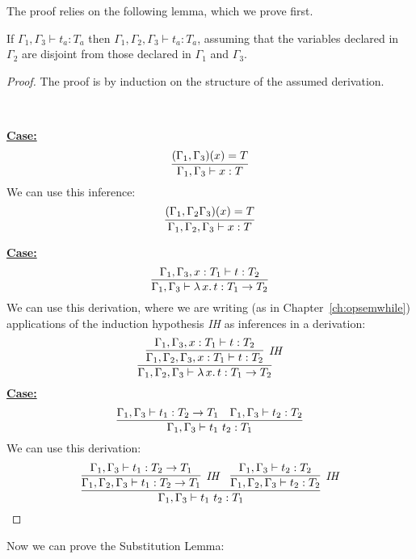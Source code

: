\documentclass{article}
\begin{document}
The proof relies on the
following lemma, which we prove first.

\begin{lemma}[Weakening]
\label{lem:stlcweak}
If $\Gamma_1, \Gamma_3 \vdash t_a : T_a$ then $\Gamma_1, \Gamma_2,
\Gamma_3 \vdash t_a : T_a$, assuming that the variables declared in
$\Gamma_2$ are disjoint from those declared in $\Gamma_1$ and
$\Gamma_3$.
\end{lemma}

\begin{proof}
The proof is by induction on the structure of the assumed derivation.

\ 

\noindent\underline{\textbf{Case:}}
\[
\infer{\Gamma_1,\Gamma_3\vdash x : T}{(\Gamma_1,\Gamma_3)(x) = T} 
\]
\noindent We can use this inference:
\[
\infer{\Gamma_1,\Gamma_2,\Gamma_3\vdash x : T}{(\Gamma_1,\Gamma_2\Gamma_3)(x) = T} 
\]

\noindent\underline{\textbf{Case:}}
\[
\infer{\Gamma_1,\Gamma_3\vdash \lambda\,x.\,t : T_1 \to T_2}
      {\Gamma_1,\Gamma_3,x:T_1\vdash t:T_2}
\]
\noindent We can use this derivation, where we are writing (as in Chapter~\ref{ch:opsemwhile})
applications of the induction hypothesis \textit{IH} as inferences in a derivation:
\[
\infer{\Gamma_1,\Gamma_2,\Gamma_3\vdash \lambda\,x.\,t : T_1 \to T_2}
      {\infer[\textit{IH}]{\Gamma_1,\Gamma_2,\Gamma_3,x:T_1\vdash t:T_2}{\Gamma_1,\Gamma_3,x:T_1\vdash t:T_2}}
\]
\noindent\underline{\textbf{Case:}}
\[
\infer{\Gamma_1,\Gamma_3\vdash t_1\ t_2 : T_1}
      {\Gamma_1,\Gamma_3\vdash t_1 : T_2 \to T_1 &
       \Gamma_1,\Gamma_3\vdash t_2 : T_2}
\]
\noindent We can use this derivation:
\[
\infer{\Gamma_1,\Gamma_3\vdash t_1\ t_2 : T_1}
      {\infer[\textit{IH}]{\Gamma_1,\Gamma_2,\Gamma_3\vdash t_1 : T_2 \to T_1}{\Gamma_1,\Gamma_3\vdash t_1 : T_2 \to T_1} &
       \infer[\textit{IH}]{\Gamma_1,\Gamma_2,\Gamma_3\vdash t_2 : T_2}{\Gamma_1,\Gamma_3\vdash t_2 : T_2}}
\]
\end{proof}

\noindent Now we can prove the Substitution Lemma:
\end{document}
